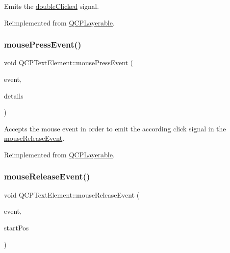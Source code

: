 Emits the \hyperlink{classQCPTextElement_a9c6fd27ae8a7c3a02df7a6bbd3509e40}{double\+Clicked} signal.

Reimplemented from \hyperlink{classQCPLayerable_a4171e2e823aca242dd0279f00ed2de81}{Q\+C\+P\+Layerable}.

\mbox{\label{classQCPTextElement_ad7b2c98355e3d2f912574b74fcee0574}} 
\subsubsection{\texorpdfstring{mouse\+Press\+Event()}{mousePressEvent()}}
{\footnotesize\ttfamily void Q\+C\+P\+Text\+Element\+::mouse\+Press\+Event (\begin{DoxyParamCaption}\item[{Q\+Mouse\+Event $\ast$}]{event,  }\item[{const Q\+Variant \&}]{details }\end{DoxyParamCaption})\hspace{0.3cm}{\ttfamily [virtual]}}

Accepts the mouse event in order to emit the according click signal in the \hyperlink{classQCPTextElement_acfcbaf9b1da18745e72726aafb39c855}{mouse\+Release\+Event}.

Reimplemented from \hyperlink{classQCPLayerable_af6567604818db90f4fd52822f8bc8376}{Q\+C\+P\+Layerable}.

\mbox{\label{classQCPTextElement_acfcbaf9b1da18745e72726aafb39c855}} 
\subsubsection{\texorpdfstring{mouse\+Release\+Event()}{mouseReleaseEvent()}}
{\footnotesize\ttfamily void Q\+C\+P\+Text\+Element\+::mouse\+Release\+Event (\begin{DoxyParamCaption}\item[{Q\+Mouse\+Event $\ast$}]{event,  }\item[{const Q\+PointF \&}]{start\+Pos }\end{DoxyParamCaption})\hspace{0.3cm}{\ttfamily [virtual]}}

